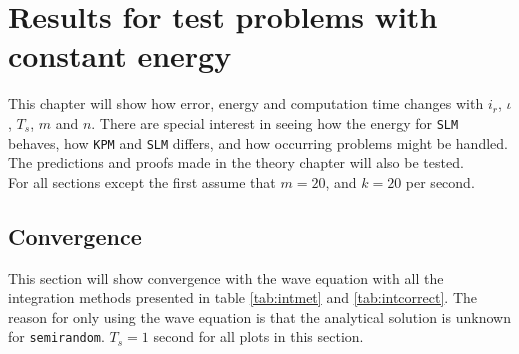 \chapter{Results for test problems with constant energy}%
\label{sec:constres}
This chapter will show how error, energy and computation time changes with $i_r$, $\iota$, $T_s$, $m$ and $n$. There are special interest in seeing how the energy for \texttt{SLM} behaves, how \texttt{KPM} and \texttt{SLM} differs, and how occurring problems might be handled. The predictions and proofs made in the theory chapter will also be tested. \\

\noindent For all sections except the first assume that $m=20$, and $k = 20$ per second. 
\section{Convergence}%
This section will show convergence with the wave equation with all the integration methods presented in table \ref{tab:intmet} and \ref{tab:intcorrect}. The reason for only using the wave equation is that the analytical solution is unknown for \texttt{semirandom}. $T_s = 1$ second for all plots in this section.
